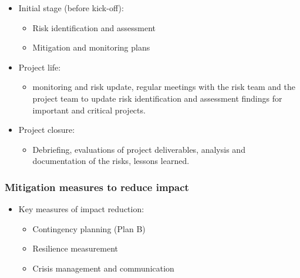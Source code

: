 \begin{itemize}
    \begin{itemize}
    \item Initial stage (before kick-off):
        \begin{itemize}
        \item Risk identification and assessment
        \item Mitigation and monitoring plans
        \end{itemize}
    \item Project life:
        \begin{itemize}
        \item monitoring and risk update, regular meetings with the risk team and the project team to update risk identification and assessment findings for important and critical projects.
        \end{itemize}
    \item Project closure:
        \begin{itemize}
        \item Debriefing, evaluations of project deliverables, analysis and documentation of the risks, lessons learned. 
        \end{itemize}
    \end{itemize}

\end{itemize}


\subsubsection{Mitigation measures to reduce impact}
\begin{itemize}
\item Key measures of impact reduction:
    \begin{itemize}
    \item Contingency planning (Plan B)
    \item Resilience measurement
    \item Crisis management and communication
    \end{itemize} 
\end{itemize}


